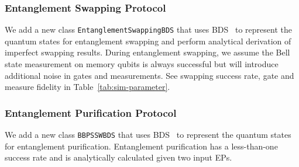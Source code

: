 \subsubsection{Entanglement Swapping Protocol}
We add a new class \texttt{EntanglementSwappingBDS} that uses BDS~\cite{zang-dqs} to represent the quantum states for entanglement swapping and perform analytical derivation of imperfect swapping results.
During entanglement swapping, we assume the Bell state measurement on memory qubits is always successful but will introduce additional noise in gates and measurements. 
See swapping success rate, gate and measure fidelity in Table~\ref{tab:sim-parameter}.

\subsubsection{Entanglement Purification Protocol}
\label{subsec:purification}
We add a new class \texttt{BBPSSWBDS} that uses BDS~\cite{zang-dqs} to represent the quantum states for entanglement purification. 
Entanglement purification has a less-than-one success rate and is analytically calculated given two input EPs.

